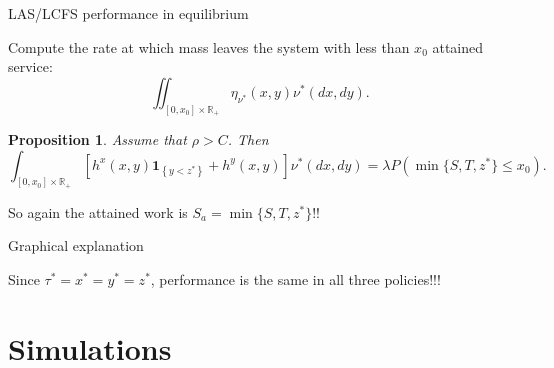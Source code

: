\documentclass[aspectratio=169]{beamer}
\newcommand{\R}{\mathbb{R}}
\newcommand{\ind}[1]{\mathbf{1}_{\left\{#1\right\}}}
\newtheorem{proposition}{Proposition}
\begin{document}
\begin{frame}{LAS/LCFS performance in equilibrium}

	Compute the rate at which mass leaves the system with less than $x_0$ attained service:
	\begin{equation*}
		\iint_{[0,x_0]\times \R_+} \eta_{\nu^*} (x,y) \nu^*(dx,dy).
	\end{equation*}

	\pause

	\begin{proposition}
		Assume that $\rho > C$. Then
		\begin{equation*}
			\int_{[0,x_0]\times \R_+} \left[h^x(x, y) \ind{y < z^*} + h^y(x, y)\right]\nu^*(dx, dy) = \lambda P\left(\min\{S, T, z^*\} \leqslant x_0\right).
		\end{equation*}
	\end{proposition}
	
	So again the attained work is $S_a = \min\{S,T,z^*\}$!!

\end{frame}


\begin{frame}{Graphical explanation}

	\begin{center}
		 
	\end{center}

	\bigskip

	Since $\tau^* = x^* = y^* = z^*$, performance is the same in all three policies!!!
\end{frame}

\section{Simulations}
\end{document}
